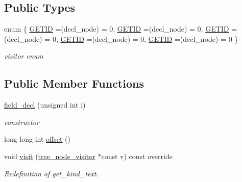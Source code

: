 \subsection*{Public Types}
\begin{DoxyCompactItemize}
\item 
enum \{ \newline
\hyperlink{structfield__decl_a3bf55db40e3c3cdc72ba40f5d07823b4acb93aef6ef5b7b4a4c758180b3db489d}{G\+E\+T\+ID} =(decl\+\_\+node) = 0, 
\hyperlink{structfield__decl_a3bf55db40e3c3cdc72ba40f5d07823b4acb93aef6ef5b7b4a4c758180b3db489d}{G\+E\+T\+ID} =(decl\+\_\+node) = 0, 
\hyperlink{structfield__decl_a3bf55db40e3c3cdc72ba40f5d07823b4acb93aef6ef5b7b4a4c758180b3db489d}{G\+E\+T\+ID} =(decl\+\_\+node) = 0, 
\hyperlink{structfield__decl_a3bf55db40e3c3cdc72ba40f5d07823b4acb93aef6ef5b7b4a4c758180b3db489d}{G\+E\+T\+ID} =(decl\+\_\+node) = 0, 
\newline
\hyperlink{structfield__decl_a3bf55db40e3c3cdc72ba40f5d07823b4acb93aef6ef5b7b4a4c758180b3db489d}{G\+E\+T\+ID} =(decl\+\_\+node) = 0
 \}\begin{DoxyCompactList}\small\item\em visitor enum \end{DoxyCompactList}
\end{DoxyCompactItemize}
\subsection*{Public Member Functions}
\begin{DoxyCompactItemize}
\item 
\hyperlink{structfield__decl_a0b28ff75222792953eb861dc00e45771}{field\+\_\+decl} (unsigned int i)
\begin{DoxyCompactList}\small\item\em constructor \end{DoxyCompactList}\item 
long long int \hyperlink{structfield__decl_a7ed575f4c4833c1be181bd962e1c1966}{offset} ()
\item 
void \hyperlink{structfield__decl_a68ef82bb50b2ebdaa89d1702aa01065e}{visit} (\hyperlink{classtree__node__visitor}{tree\+\_\+node\+\_\+visitor} $\ast$const v) const override
\begin{DoxyCompactList}\small\item\em Redefinition of get\+\_\+kind\+\_\+text. \end{DoxyCompactList}\end{DoxyCompactItemize}
